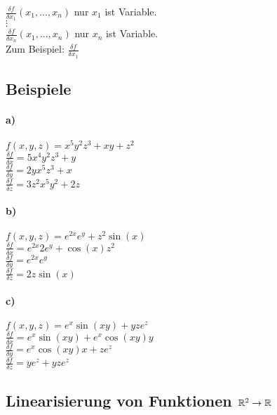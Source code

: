 $\frac{\delta f}{\delta x_1} (x_1, ..., x_n)$ nur $x_1$ ist Variable.\\
$\vdots$\\
$\frac{\delta f}{\delta x_n} (x_1, ..., x_n)$ nur $x_n$ ist Variable.\\
Zum Beispiel: $\frac{\delta f}{\delta x_1}$\\

\subsection{Beispiele}
\paragraph{a)} $f(x,y,z) = x^5y^2z^3 + xy + z^2$\\
$\frac{\delta f}{\delta x} = 5x^4 y^2 z^3 + y$\\
$\frac{\delta f}{\delta y} = 2y x^5 z^3 + x$\\
$\frac{\delta f}{\delta z} = 3z^2 x^5 y^2 + 2z$\\

\paragraph{b)} $ f(x,y,z) = e^{2x} e^y + z^2 \sin(x) $\\
$\frac{\delta f}{\delta x} = e^{2x} 2 e^y + \cos(x) z^2 $\\
$\frac{\delta f}{\delta y} = e^{2x} e^y $\\
$\frac{\delta f}{\delta z} = 2z  \sin(x) $\\

\paragraph{c)} $ f(x,y,z) = e^x \sin(xy) + yz  e^z $\\
$\frac{\delta f}{\delta x} = e^x \sin(xy) + e^x \cos(xy) y $\\
$\frac{\delta f}{\delta y} = e^x \cos(xy) x + z e^z $\\
$\frac{\delta f}{\delta z} = y e^z + yz e^z$\\


\subsection{Linearisierung von Funktionen $\mathbb{R}^2 \rightarrow \mathbb{R}$} 

